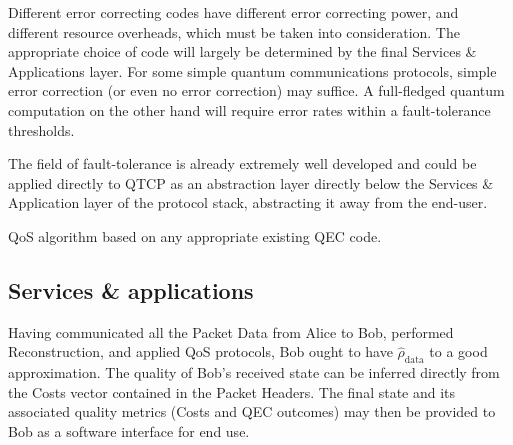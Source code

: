 \documentclass[aps,rmp,twocolumn,amsmath,amssymb,nofootinbib,superscriptaddress,longbibliography,floatfix]{revtex4-1}
\begin{document}
Different error correcting codes have different error correcting power, and different resource overheads, which must be taken into consideration. The appropriate choice of code will largely be determined by the final {\sc Services \& Applications} layer. For some simple quantum communications protocols, simple error correction (or even no error correction) may suffice. A full-fledged quantum computation on the other hand will require error rates within a fault-tolerance thresholds.

The field of fault-tolerance is already extremely well developed and could be applied directly to QTCP as an abstraction layer directly below the {\sc Services \& Application} layer of the protocol stack, abstracting it away from the end-user.

\begin{table}[!htb]
\caption{QoS algorithm based on any appropriate existing QEC code.} \label{tab:qos}
\end{table}

%
%

\subsection{Services \& applications}

Having communicated all the {\sc Packet Data} from Alice to Bob, performed {\sc Reconstruction}, and applied {\sc QoS} protocols, Bob ought to have $\hat\rho_\mathrm{data}$ to a good approximation. The quality of Bob's received state can be inferred directly from the {\sc Costs} vector contained in the {\sc Packet Headers}. The final state and its associated quality metrics ({\sc Costs} and QEC outcomes) may then be provided to Bob as a software interface for end use.
\end{document}
